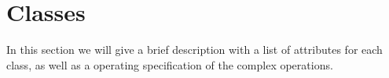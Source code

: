 \section{Classes}
In this section we will give a brief description with a list of attributes for each class, as well as a operating specification of the complex operations.
\begin{comment}
 \paragraph{Person:}This class purpose is to register new users in the helpdesk. When a person register, he/she need to provide the Person class with following attributes:
\begin{itemize}
 \item{name}
 \item{mail}
 \item{username}
 \item{password}
\end{itemize}
 
\paragraph{Login:}\fixme{Hvad er det for en klasse?}After a user is registered in the helpdesk, he/she can login using their username and password they choose when registering. The login class purpose it to make sure all users is registered before they can submit problems and add comments. The login class need the following attributes: \fixme{Hvad er det for en klasse?}
\begin{itemize}
\item{username}
\item{password}
\end{itemize}
 
\paragraph{HelpdeskWindow:} \fixme{Hvad er det for en klasse?}All windows in the helpdesk inherits from this class. The HelpdeskWindow class is an abstact class, which purpose is to provide a standard layout for all windows. This class use the following attributes: \fixme{Hvad er det for en klasse?}
\begin{itemize}
\item{width}
\item{height}
\item{position}
\end{itemize}


\end{comment}
